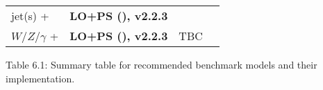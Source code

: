 \begin{footnotesize}
\begin{table}
\begin{tabular}{llrr}
	jet(s) + \MET{} & \textbf{LO+PS (\madgraph), v2.2.3} & \cite{ForumSVN_TChannel}& \cite{Papucci:2014iwa} \\ 
	$W/Z/\gamma$ + \MET{} & \textbf{LO+PS (\madgraph), v2.2.3} & TBC  & \cite{Alwall:2014hca,Alloul:2013bka,Degrande:2011ua}\\ 
		
%	
	
	\bottomrule 
	\end{tabular}
\end{table}

\end{footnotesize}

\begin{center}
	Table 6.1: Summary table for recommended benchmark models and their implementation.
\end{center}
